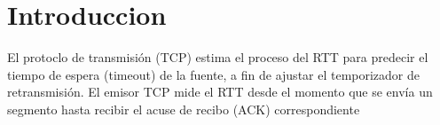 
\section*{Introduccion}

\noindent El protoclo de transmisi\'on (TCP) estima el proceso del RTT para predecir el tiempo de espera (timeout) de la fuente, a fin de ajustar el temporizador de retransmisi\'on. El emisor TCP mide el RTT desde el momento que se env\'ia un segmento hasta recibir el acuse de recibo (ACK) correspondiente